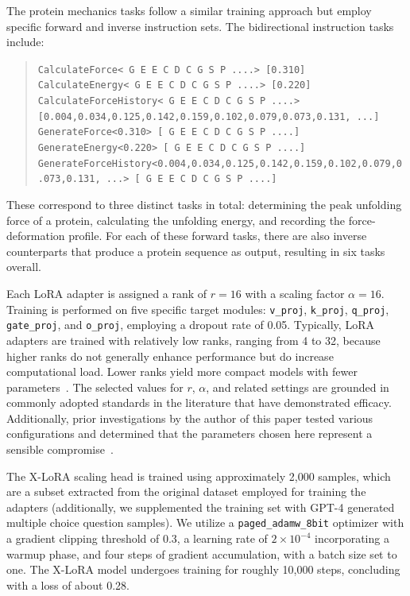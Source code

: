 The protein mechanics tasks follow a similar training approach but employ specific forward and inverse instruction sets. The bidirectional instruction tasks include:

\begin{quote}
\tiny {\texttt{CalculateForce< G E E C D C G S P ....> [0.310]\\
CalculateEnergy< G E E C D C G S P ....> [0.220]\\ 
CalculateForceHistory< G E E C D C G S P ....> [0.004,0.034,0.125,0.142,0.159,0.102,0.079,0.073,0.131, ...]\\
GenerateForce<0.310>\,[ G E E C D C G S P ....]\\
GenerateEnergy<0.220>\,[ G E E C D C G S P ....]\\
GenerateForceHistory<0.004,0.034,0.125,0.142,0.159,0.102,0.079,0.073,0.131, ...>\,[ G E E C D C G S P ....] }}
\end{quote}

These correspond to three distinct tasks in total: determining the peak unfolding force of a protein, calculating the unfolding energy, and recording the force-deformation profile. For each of these forward tasks, there are also inverse counterparts that produce a protein sequence as output, resulting in six tasks overall.

Each LoRA adapter is assigned a rank of $r=16$ with a scaling factor $\alpha=16$. Training is performed on five specific target modules: \texttt{v\_proj}, \texttt{k\_proj}, \texttt{q\_proj}, \texttt{gate\_proj}, and \texttt{o\_proj}, employing a dropout rate of 0.05. Typically, LoRA adapters are trained with relatively low ranks, ranging from 4 to 32, because higher ranks do not generally enhance performance but do increase computational load. Lower ranks yield more compact models with fewer parameters~\cite{hu2021lora}. The selected values for $r$, $\alpha$, and related settings are grounded in commonly adopted standards in the literature that have demonstrated efficacy. Additionally, prior investigations by the author of this paper tested various configurations and determined that the parameters chosen here represent a sensible compromise~\cite{Luu2023BioinspiredLLM:Materials}.

The X-LoRA scaling head is trained using approximately 2,000 samples, which are a subset extracted from the original dataset employed for training the adapters (additionally, we supplemented the training set with GPT-4 generated multiple choice question samples). We utilize a \texttt{paged\_adamw\_8bit} optimizer with a gradient clipping threshold of 0.3, a learning rate of $2\times 10^{-4}$ incorporating a warmup phase, and four steps of gradient accumulation, with a batch size set to one. The X-LoRA model undergoes training for roughly 10,000 steps, concluding with a loss of about 0.28.

